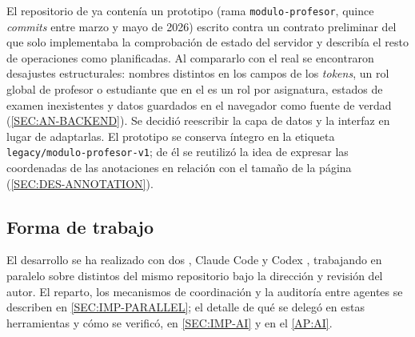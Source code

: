 El repositorio de  ya contenía un prototipo (rama \texttt{modulo-profesor},
quince \textit{commits} entre marzo y mayo de 2026) escrito contra un contrato preliminar
del  que solo implementaba la comprobación de estado del servidor y describía
el resto de operaciones como planificadas. Al compararlo con el  real se
encontraron desajustes estructurales: nombres distintos en los campos de los
\textit{tokens}, un rol global de profesor o estudiante que en el  es un rol
por asignatura, estados de examen inexistentes y datos guardados en el navegador como
fuente de verdad (\cref{SEC:AN-BACKEND}). Se decidió reescribir la capa de datos y la
interfaz en lugar de adaptarlas. El prototipo se conserva íntegro en la etiqueta
\texttt{legacy/modulo-profesor-v1}; de él se reutilizó la idea de expresar las coordenadas
de las anotaciones en relación con el tamaño de la página (\cref{SEC:DES-ANNOTATION}).

\subsection*{Forma de trabajo}

El desarrollo se ha realizado con dos , Claude Code \cite{claude_code_docs} y
Codex \cite{openai_codex}, trabajando en paralelo sobre  distintos del
mismo repositorio \cite{git_worktree} bajo la dirección y revisión del autor. El reparto,
los mecanismos de coordinación y la auditoría entre agentes se describen en
\cref{SEC:IMP-PARALLEL}; el detalle de qué se delegó en estas herramientas y cómo se
verificó, en \cref{SEC:IMP-AI} y en el \cref{AP:AI}.

